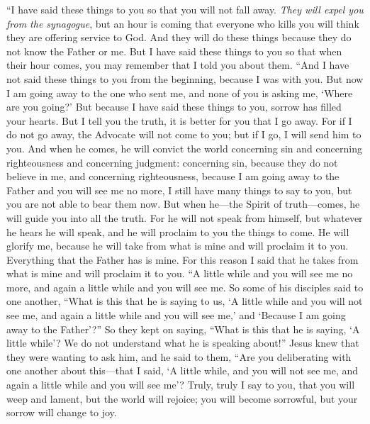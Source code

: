 \begin{biblechapter} %
 “I have said these things to you so that you will not fall away.
\verse \textit{They will expel you from the synagogue}, but an hour is coming that everyone who kills you will think they are offering service to God.
\verse And they will do these things because they do not know the Father or me.
\verse But I have said these things to you so that when their hour comes, you may remember that I told you about them.
 “And I have not said these things to you from the beginning, because I was with you.
\verse But now I am going away to the one who sent me, and none of you is asking me, ‘Where are you going?’
\verse But because I have said these things to you, sorrow has filled your hearts.
\verse But I tell you the truth, it is better for you that I go away. For if I do not go away, the Advocate will not come to you; but if I go, I will send him to you.
\verse And when he comes, he will convict the world concerning sin and concerning righteousness and concerning judgment:
\verse concerning sin, because they do not believe in me,
\verse and concerning righteousness, because I am going away to the Father and you will see me no more,
\verse I still have many things to say to you, but you are not able to bear them now.
\verse But when he—the Spirit of truth—comes, he will guide you into all the truth. For he will not speak from himself, but whatever he hears he will speak, and he will proclaim to you the things to come.
\verse He will glorify me, because he will take from what is mine and will proclaim it to you.
\verse Everything that the Father has is mine. For this reason I said that he takes from what is mine and will proclaim it to you.
 “A little while and you will see me no more, and again a little while and you will see me.
\verse So some of his disciples said to one another, “What is this that he is saying to us, ‘A little while and you will not see me, and again a little while and you will see me,’ and ‘Because I am going away to the Father’?”
\verse So they kept on saying, “What is this that he is saying, ‘A little while’? We do not understand what he is speaking about!”
\verse Jesus knew that they were wanting to ask him, and he said to them, “Are you deliberating with one another about this—that I said, ‘A little while, and you will not see me, and again a little while and you will see me’?
\verse Truly, truly I say to you, that you will weep and lament, but the world will rejoice; you will become sorrowful, but your sorrow will change to joy.

\end{biblechapter}
